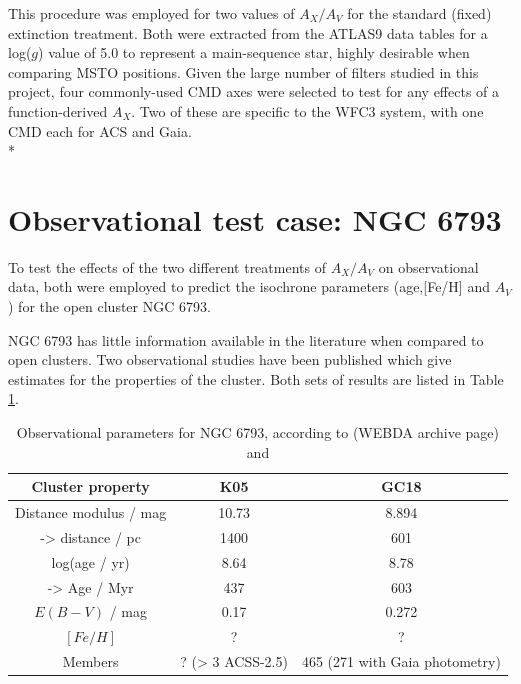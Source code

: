 \documentclass[12pt, a4paper]{report}
\begin{document}
This procedure was employed for two values of $A_{X}/A_{V}$ for the standard (fixed) extinction treatment. Both were extracted from the ATLAS9 data tables for a log($g$) value of 5.0 to represent a main-sequence star, highly desirable when comparing MSTO positions. Given the large number of filters studied in this project, four commonly-used CMD axes were selected to test for any effects of a function-derived $A_{X}$. Two of these are specific to the WFC3 system, with one CMD each for ACS and Gaia.\\*

\section{Observational test case: NGC 6793}
To test the effects of the two different treatments of $A_{X}/A_{V}$ on observational data, both were employed to predict the isochrone parameters (age,[Fe/H] and $A_{V}$) for the open cluster NGC 6793.

NGC 6793 has little information available in the literature when compared to open clusters. Two observational studies have been published which give estimates for the properties of the cluster. Both sets of results are listed in Table \ref{NGC6793_obs}.

\begin{table}
\begin{center}
\begin{tabular}{ccc}
\hline
Cluster property & K05 & GC18 \\
\hline
Distance modulus / mag & 10.73 & 8.894 \\
-> distance / pc & 1400 & 601 \\
log(age / yr) & 8.64 & 8.78 \\
-> Age / Myr & 437 & 603 \\
$E(B-V)$ / mag & 0.17 & 0.272 \\
$[Fe/H]$ & ? & ? \\
Members & ? (> 3 ACSS-2.5) & 465 (271 with Gaia photometry) \\
\hline
\end{tabular}
\caption{Observational parameters for NGC 6793, according to \cite{2005A&A...438.1163K} (WEBDA archive page) and \cite{2018A&A...616A..10G}}
\label{NGC6793_obs}
\end{center}
\end{table}
\end{document}
